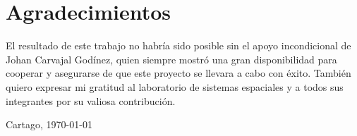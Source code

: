 \chapter*{Agradecimientos}
\thispagestyle{empty}

El resultado de este trabajo no habría sido posible sin el apoyo incondicional de 
Johan Carvajal Godínez, quien siempre mostró una gran disponibilidad para cooperar 
y asegurarse de que este proyecto se llevara a cabo con éxito. También quiero expresar
mi gratitud al laboratorio de sistemas espaciales y a todos sus 
integrantes por su valiosa contribución.

\vspace*{1cm}

\thesisAuthor

Cartago, \today

\cleardoublepage

